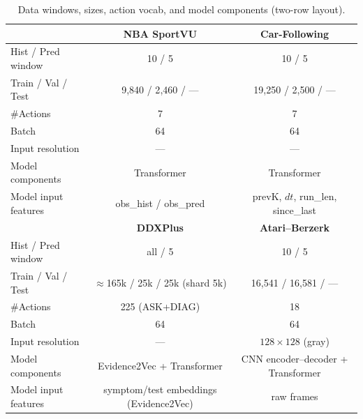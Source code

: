 \documentclass{article} %
\begin{document}
\begin{table}[t]
\centering
\small
\setlength{\tabcolsep}{6pt}
\renewcommand{\arraystretch}{1.15}
\caption{Data windows, sizes, action vocab, and model components (two-row layout).}
\label{tab:exp-params-data-model-T}
\begin{tabular}{lcc}
\toprule
 & \textbf{NBA SportVU} & \textbf{Car-Following} \\
\midrule
Hist / Pred window & 10 / 5 & 10 / 5 \\
Train / Val / Test & 9{,}840 / 2{,}460 / — & 19{,}250 / 2{,}500 / — \\
\#Actions & 7 & 7 \\
Batch & 64 & 64 \\
Input resolution & — & — \\
Model components & Transformer & Transformer \\
Model input features & obs\_hist / obs\_pred & prevK, $dt$, run\_len, since\_last \\
\midrule
 & \textbf{DDXPlus} & \textbf{Atari–Berzerk} \\
\midrule
Hist / Pred window & all / 5 & 10 / 5 \\
Train / Val / Test & $\approx$165k / 25k / 25k \newline (shard 5k) & 16{,}541 / 16{,}581 / — \\
\#Actions & 225 (ASK+DIAG) & 18 \\
Batch & 64 & 64 \\
Input resolution & — & $128{\times}128$ (gray) \\
Model components & Evidence2Vec + Transformer & CNN encoder–decoder + Transformer \\
Model input features & symptom/test embeddings (Evidence2Vec) & raw frames \\
\bottomrule
\end{tabular}
\end{table}
\end{document}
